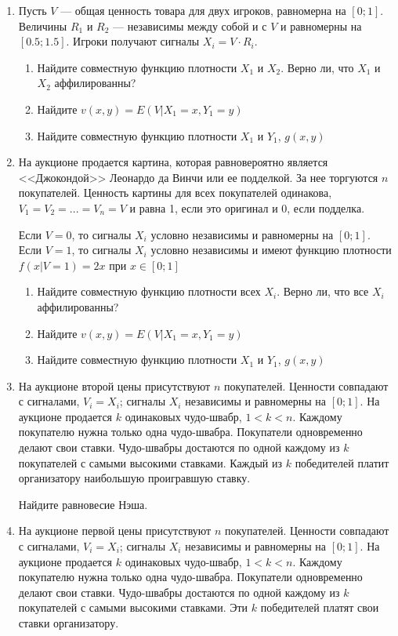 \documentclass[pdftex,12pt,a4paper]{article}
\begin{document}
\begin{enumerate}


\item Пусть $  V $ --- общая ценность товара для двух игроков, равномерна на $ [0;1] $. Величины $ R_{1} $ и $ R_{2} $ --- независимы между собой и с $ V $ и равномерны на $ [0.5;1.5] $. Игроки получают сигналы $ X_{i}=V\cdot R_{i} $. 
\begin{enumerate}
\item Найдите совместную функцию плотности $ X_{1} $ и $ X_{2} $. Верно ли, что $ X_{1} $ и $ X_{2} $ аффилированны?
\item Найдите $ v(x,y)=E(V|X_{1}=x,Y_{1}=y) $ 
\item Найдите совместную функцию плотности $ X_{1} $ и $ Y_{1} $, $ g(x,y) $
\end{enumerate}


\item На аукционе продается картина, которая равновероятно является <<Джокондой>> Леонардо да Винчи или ее подделкой. За нее торгуются $ n $ покупателей. Ценность картины для всех покупателей одинакова, $ V_{1}=V_{2}=...=V_{n}=V $ и равна 1, если это оригинал и 0, если подделка.

Если $ V=0 $, то сигналы $ X_{i} $ условно независимы и равномерны на $ [0;1] $. Если $ V=1 $, то сигналы $ X_{i} $ условно независимы и имеют функцию плотности $ f(x|V=1)=2x $ при  $x\in [0;1] $
\begin{enumerate}
\item Найдите совместную функцию плотности всех $ X_{i} $. Верно ли, что все $ X_{i} $ аффилированны?
\item Найдите $ v(x,y)=E(V|X_{1}=x,Y_{1}=y) $
\item Найдите совместную функцию плотности $ X_{1} $ и $ Y_{1} $, $ g(x,y) $
\end{enumerate}

\item На аукционе второй цены присутствуют $ n $ покупателей. Ценности совпадают с сигналами, $ V_{i}=X_{i} $; сигналы $ X_{i} $ независимы и равномерны на $ [0;1] $. На аукционе продается $k$ одинаковых чудо-швабр, $ 1<k<n $. Каждому покупателю нужна только одна чудо-швабра. Покупатели одновременно делают свои ставки. Чудо-швабры достаются по одной каждому из $ k $ покупателей с самыми высокими ставками. Каждый из $ k $ победителей платит организатору наибольшую проигравшую ставку.

Найдите равновесие Нэша.


\item На аукционе первой цены присутствуют $ n $ покупателей. Ценности совпадают с сигналами, $ V_{i}=X_{i} $; сигналы $ X_{i} $ независимы и равномерны на $ [0;1] $. На аукционе продается $k$ одинаковых чудо-швабр, $ 1<k<n $. Каждому покупателю нужна только одна чудо-швабра. Покупатели одновременно делают свои ставки. Чудо-швабры достаются по одной каждому из $ k $ покупателей с самыми высокими ставками. Эти $ k $ победителей платят свои ставки организатору.


\end{enumerate}
\end{document}
